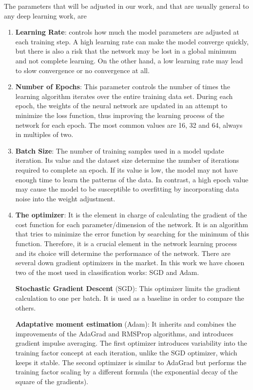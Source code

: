 The parameters that will be adjusted in our work, and that are usually general to any deep learning work, are 
\begin{enumerate}
    \item \textbf{Learning Rate}: controls how much the model parameters are adjusted at each training step. A high learning rate can make the model converge quickly, but there is also a risk that the network may be lost in a global minimum and not complete learning. On the other hand, a low learning rate may lead to slow convergence or no convergence at all.

    \item \textbf{Number of Epochs}: This parameter controls the number of times the learning algorithm iterates over the entire training data set. During each epoch, the weights of the neural network are updated in an attempt to minimize the loss function, thus improving the learning process of the network for each epoch. The most common values are 16, 32 and 64, always in multiples of two.

    \item \textbf{Batch Size}: The number of training samples used in a model update iteration. Its value and the dataset size determine the number of iterations required to complete an epoch. If its value is low, the model may not have enough time to learn the patterns of the data. In contrast, a high epoch value may cause the model to be susceptible to overfitting by incorporating data noise into the weight adjustment.

    \item \textbf{The optimizer}: It is the element in charge of calculating the gradient of the cost function for each parameter/dimension of the network. It is an algorithm that tries to minimize the error function by searching for the minimum of this function. Therefore, it is a crucial element in the network learning process and its choice will determine the performance of the network. There are several down gradient optimizers in the market. In this work we have chosen two of the most used in classification works: SGD and Adam.

    \textbf{Stochastic Gradient Descent} (SGD): This optimizer limits the gradient calculation to one per batch. It is used as a baseline in order to compare the others.
    
    \textbf{Adaptative moment estimation} (Adam): It inherits and combines the improvements of the AdaGrad and RMSProp algorithms, and introduces gradient impulse averaging. The first optimizer introduces variability into the training factor concept at each iteration, unlike the SGD optimizer, which keeps it stable. The second optimizer is similar to AdaGrad but performs the training factor scaling by a different formula (the exponential decay of the square of the gradients).


\end{enumerate}
